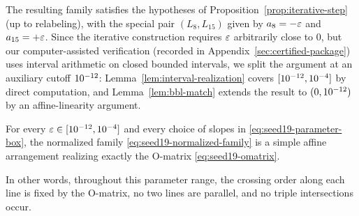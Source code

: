 The resulting family satisfies the hypotheses of
Proposition~\ref{prop:iterative-step} (up to relabeling), with the special
pair $(L_8,L_{15})$ given by $a_8=-\varepsilon$ and $a_{15}=+\varepsilon$.
Since the iterative construction requires $\varepsilon$ arbitrarily close to $0$,
but our computer-assisted verification (recorded in
Appendix~\ref{sec:certified-package}) uses interval arithmetic on closed
bounded intervals, we split the argument
at an auxiliary cutoff $10^{-12}$:
Lemma~\ref{lem:interval-realization} covers
$[10^{-12},10^{-4}]$ by direct computation, and
Lemma~\ref{lem:bbl-match} extends the result to
$(0,10^{-12})$ by an affine-linearity argument.

\begin{lemma}\label{lem:interval-realization}
For every $\varepsilon\in[10^{-12},10^{-4}]$ and every
choice of slopes in \eqref{eq:seed19-parameter-box},
the normalized family \eqref{eq:seed19-normalized-family} is a simple affine
arrangement realizing exactly the $\mathrm{O}$-matrix
\eqref{eq:seed19-omatrix}.

In other words, throughout this parameter range, the crossing order along each
line is fixed by the $\mathrm{O}$-matrix, no two lines are parallel,
and no triple intersections occur.
\end{lemma}

